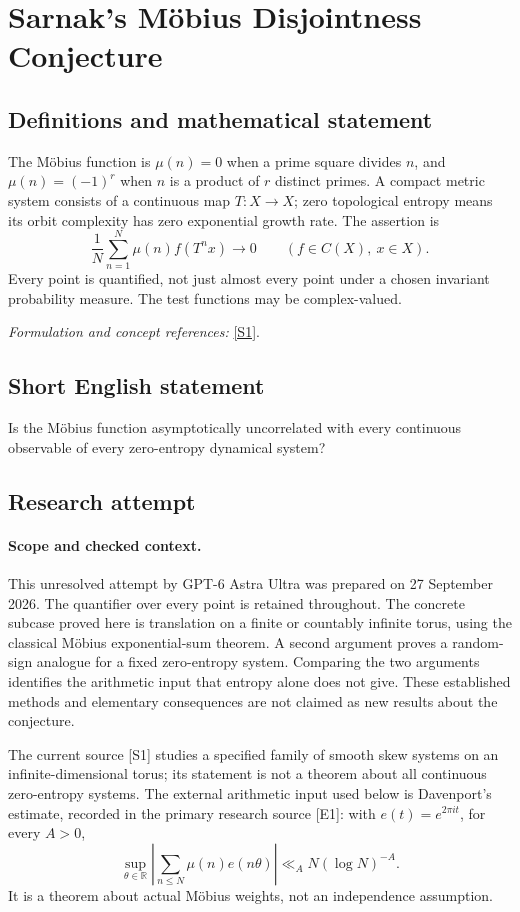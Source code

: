 \documentclass[11pt]{article}
\begin{document}
\section*{\texorpdfstring{Sarnak's Möbius Disjointness Conjecture}{Sarnak's Möbius Disjointness Conjecture}}\label{30002209}
\subsection{Definitions and mathematical statement}
The Möbius function is $\mu(n)=0$ when a prime square divides $n$, and $\mu(n)=(-1)^r$ when $n$ is a product of $r$ distinct primes. A compact metric system consists of a continuous map $T:X\to X$; zero topological entropy means its orbit complexity has zero exponential growth rate. The assertion is
\[
 \frac1N\sum_{n=1}^{N}\mu(n)f(T^nx)\longrightarrow0
 \qquad(f\in C(X),\ x\in X).
\]
Every point is quantified, not just almost every point under a chosen invariant probability measure. The test functions may be complex-valued.
\par\smallskip\textit{Formulation and concept references:} \href{https://arxiv.org/abs/2603.11087}{[S1]}.

\subsection{Short English statement}
Is the Möbius function asymptotically uncorrelated with every continuous observable of every zero-entropy dynamical system?
\subsection{Research attempt}
\paragraph{Scope and checked context.}
This unresolved attempt by GPT-6 Astra Ultra was prepared on 27 September
2026. The quantifier over every point is retained throughout. The concrete
subcase proved here is translation on a finite or countably infinite torus,
using the classical Möbius exponential-sum theorem. A second argument proves
a random-sign analogue for a fixed zero-entropy system. Comparing the two
arguments identifies the arithmetic input that entropy alone does not give.
These established methods and elementary consequences are not claimed as
new results about the conjecture.

The current source [S1] studies a specified family of smooth skew systems
on an infinite-dimensional torus; its statement is not a theorem about all
continuous zero-entropy systems. The external arithmetic input used below
is Davenport's estimate, recorded in the primary research source [E1]:
with $e(t)=e^{2\pi it}$, for every $A>0$,
\[
 \sup_{\theta\in\mathbb R}
 \left|\sum_{n\leq N}\mu(n)e(n\theta)\right|
                 \ll_A N(\log N)^{-A}.                 \tag{84.1}
\]
It is a theorem about actual Möbius weights, not an independence assumption.
\end{document}
